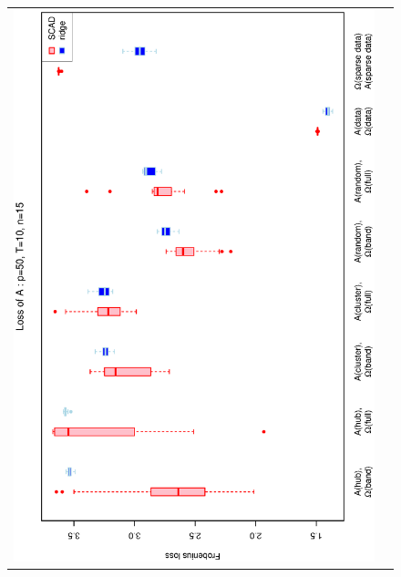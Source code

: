 \documentclass[a4paper]{article}
\begin{document}
\begin{figure}[h!]
\centering
\begin{tabular}{cc}
\includegraphics[scale=0.5,angle=270]{LossA50T10N15.eps}\\

\end{tabular}
\end{figure}
\end{document}
